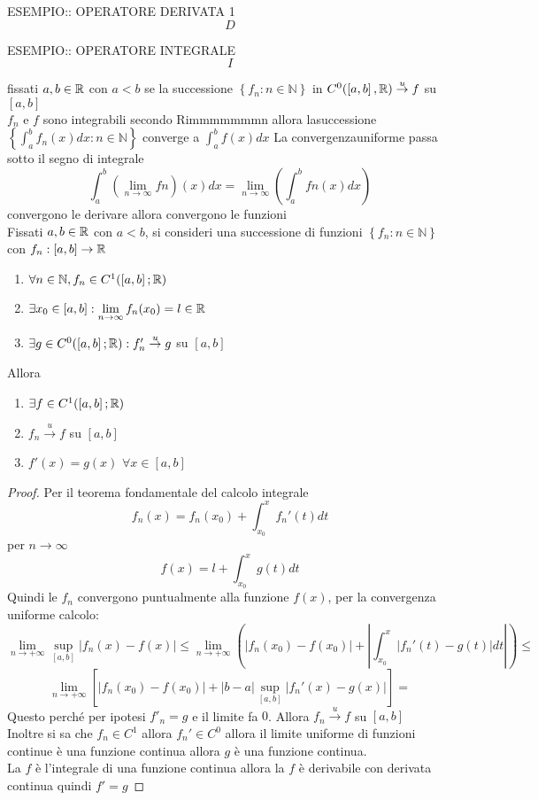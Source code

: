 ESEMPIO:: OPERATORE DERIVATA 1\\
$$D$$

ESEMPIO:: OPERATORE INTEGRALE\\
$$I$$

\proposition
fissati $a,b\in \mathbb{R}$ con $a<b$ se la successione $\left\{f_n:n\in\mathbb{N}\right\}$ in $C^0(\left[a,b\right], \mathbb{R})\overset{u}{\to}f$ su $\left[a,b\right]$\\
$f_n$ e $f$ sono integrabili secondo Rimmmmmmmn allora lasuccessione $\left\{\int_a^bf_n(x)dx:n\in\mathbb{N}\right\}$ converge a $\int_a^bf(x)dx$
\observation
La convergenzauniforme passa sotto il segno di integrale 
$$\int_a^b\left(\lim\limits_{n\to\infty}fn\right)(x)dx=\lim\limits_{n\to\infty}\left(\int_a^bfn(x)dx\right)$$
\proposition convergono le derivare allora convergono le funzioni\\
Fissati $a,b\in \mathbb{R}$ con $a<b$, si consideri una successione di funzioni $\left\{f_n:n\in\mathbb{N}\right\}$ con $f_n:\left[a,b\right]\to \mathbb{R}$
\begin{enumerate}
	\item $\forall n\in\mathbb{N}, f_n\in C^1(\left[a,b\right]; \mathbb{R})$
	\item $\exists x_0\in\left[a,b\right]: \lim\limits_{n\to\infty}f_n(x_0)=l\in \mathbb{R}$
	\item $\exists g \in C^0(\left[a,b\right]; \mathbb{R}):f'_n\overset{u}{\to}g$ su $\left[a,b\right]$
\end{enumerate}
Allora
\begin{enumerate}
	\item $\exists f\in C^1(\left[a,b\right]; \mathbb{R})$
	\item $f_n\overset{u}{\to}f$ su $\left[a,b\right]$
	\item $f'(x)=g(x)$ $\forall x\in\left[a,b\right]$
\end{enumerate}
\begin{proof}
	Per il teorema fondamentale del calcolo integrale
	$$f_n(x)=f_n(x_0)+\int_{x_0}^{x}f_n'(t)dt$$
	per $n\to\infty$
	$$f(x)=l+\int_{x_0}^{x}g(t)dt$$
	Quindi le $f_n$ convergono puntualmente alla funzione $f(x)$, per la convergenza uniforme calcolo:
	$$ \lim\limits_{n\to+\infty}\sup\limits_{\left[a,b\right]}\left|f_n(x)-f(x)\right|\le\lim\limits_{n\to+\infty}\left(  \left| f_n(x_0)-f(x_0) \right|+\left|\int_{x_0}^x\left|f_n'(t)-g(t)\right|dt\right| \right)\le$$
	$$\lim\limits_{n\to+\infty}\left[ \left|f_n(x_0)-f(x_0)\right|+\left|b-a\right|\sup\limits_{\left[a,b\right]}\left|f_n'(x)-g(x)\right| \right] = $$
	Questo perché per ipotesi $f'_n=g$ e il limite fa $0$.
	Allora $f_n\overset{u}{\to}f$ su $\left[a,b\right]$\\
	Inoltre si sa che $f_n\in C^1$ allora $f_n'\in C^0$ allora il limite uniforme di funzioni continue è una funzione continua allora $g$ è una funzione continua.\\
	La $f$ è l'integrale di una funzione continua allora la $f$ è derivabile con derivata continua quindi $f'=g$
\end{proof}
